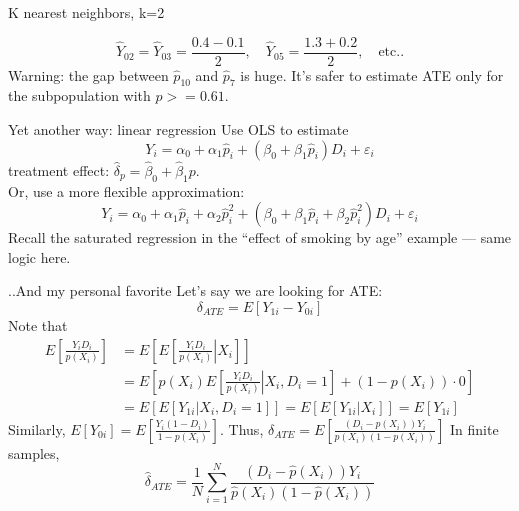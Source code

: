 \documentclass[beamer,compress]{beamer}
\begin{document}
\begin{frame}{K nearest neighbors, k=2}

\begin{equation*}
	\widehat{Y}_{02} = \widehat{Y}_{03} = \frac{0.4 - 0.1}{2}, \quad \widehat{Y}_{05} = \frac{1.3 + 0.2}{2}, \quad \text{etc..}
\end{equation*}
Warning: the gap between $\widehat{p}_{10}$ and $\widehat{p}_{7}$ is huge. It's safer to estimate ATE only for the subpopulation with $p>=0.61$.
\end{frame}

\begin{frame}{Yet another way: linear regression}
	Use OLS to estimate
	\begin{equation*}
		Y_i = \alpha_0 + \alpha_1\widehat{p}_i + (\beta_0 + \beta_1\widehat{p}_i)D_i + \varepsilon_i
	\end{equation*}
	treatment effect: $\widehat{\delta}_p = \widehat{\beta}_0 + \widehat{\beta}_1p$.\\
	
	Or, use a more flexible approximation:
	\begin{equation*}
		Y_i = \alpha_0 + \alpha_1\widehat{p}_i + \alpha_2\widehat{p}_i^2 + (\beta_0 + \beta_1\widehat{p}_i + \beta_2\widehat{p}^2_i)D_i + \varepsilon_i
	\end{equation*}
	Recall the saturated regression in the ``effect of smoking by age'' example --- same logic here.
\end{frame}

\begin{frame}{..And my personal favorite}
	Let's say we are looking for ATE:
	\begin{equation*}
		\delta_{ATE} = E[Y_{1i} - Y_{0i}]
	\end{equation*}
	Note that
	\begin{align*}
		E\left[\frac{Y_iD_i}{p(X_i)}\right] &=  E\left[E\left[\left.\frac{Y_iD_i}{p(X_i)}\right|X_i\right]\right]\\
		&=E\left[p(X_i)E\left[\left.\frac{Y_iD_i}{p(X_i)}\right|X_i, D_i=1\right] + (1-p(X_i))\cdot{}0\right]\\
		&=E\left[E\left[\left.Y_{1i}\right|X_i, D_i=1\right]\right] = E\left[E\left[\left.Y_{1i}\right|X_i\right]\right] = E\left[Y_{1i}\right]
	\end{align*}
	Similarly, $E[Y_{0i}] = E\left[\frac{Y_i(1-D_i)}{1-p(X_i)}\right]$. Thus, $\delta_{ATE} = E\left[\frac{(D_i-p(X_i))Y_i}{p(X_i)(1-p(X_i))}\right]$
	In finite samples,
	\begin{equation*}
		\widehat{\delta}_{ATE} = \frac{1}{N}\sum\limits_{i=1}^N\frac{(D_i-\widehat{p}(X_i))Y_i}{\widehat{p}(X_i)(1-\widehat{p}(X_i))}
	\end{equation*}
\end{frame}
\end{document}
